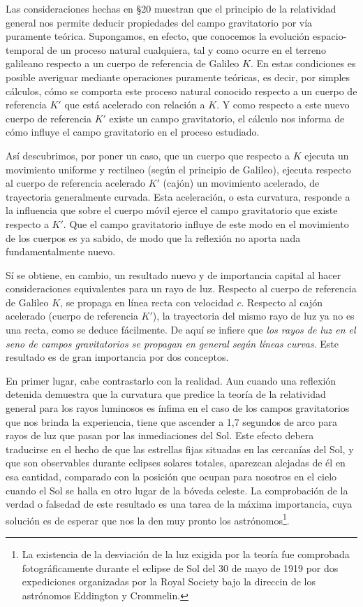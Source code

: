 \documentclass[spanish]{book}
\begin{document}
Las consideraciones hechas en \S 20 muestran que el principio de la relatividad
general nos permite deducir propiedades del campo gravitatorio por vía puramente
teórica. Supongamos, en efecto, que conocemos la evolución espacio-temporal de un
proceso natural cualquiera, tal y como ocurre en el terreno galileano respecto a un
cuerpo de referencia de Galileo $K$. En estas condiciones es posible averiguar mediante
operaciones puramente teóricas, es decir, por simples cálculos, cómo se comporta este
proceso natural conocido respecto a un cuerpo de referencia $K'$ que está acelerado con
relación a $K$. Y como respecto a este nuevo cuerpo de referencia $K'$ existe un campo
gravitatorio, el cálculo nos informa de cómo influye el campo gravitatorio en el
proceso estudiado.

Así descubrimos, por poner un caso, que un cuerpo que respecto a $K$ ejecuta un
movimiento uniforme y rectilneo (según el principio de Galileo), ejecuta respecto al
cuerpo de referencia acelerado $K'$ (cajón) un movimiento acelerado, de trayectoria
generalmente curvada. Esta aceleración, o esta curvatura, responde a la influencia que
sobre el cuerpo móvil ejerce el campo gravitatorio que existe respecto a $K'$. Que el
campo gravitatorio influye de este modo en el movimiento de los cuerpos es ya sabido,
de modo que la reflexión no aporta nada fundamentalmente nuevo.

Sí se obtiene, en cambio, un resultado nuevo y de importancia capital al hacer
consideraciones equivalentes para un rayo de luz. Respecto al cuerpo de referencia de
Galileo $K$, se propaga en línea recta con velocidad $c$. Respecto al cajón acelerado
(cuerpo de referencia $K'$), la trayectoria del mismo rayo de luz ya no es una recta, como
se deduce fácilmente. De aquí se infiere que \textit{los rayos de luz en el seno de campos
gravitatorios se propagan en general según líneas curvas}. Este resultado es de gran
importancia por dos conceptos.

En primer lugar, cabe contrastarlo con la realidad. Aun cuando una reflexión
detenida demuestra que la curvatura que predice la teoría de la relatividad general para
los rayos luminosos es ínfima en el caso de los campos gravitatorios que nos brinda
la experiencia, tiene que ascender a 1,7 segundos de arco para rayos de luz que pasan
por las inmediaciones del Sol. Este efecto debera traducirse en el hecho de que las
estrellas fijas situadas en las cercanías del Sol, y que son observables durante eclipses
solares totales, aparezcan alejadas de él en esa cantidad, comparado con la posición
que ocupan para nosotros en el cielo cuando el Sol se halla en otro lugar de la bóveda
celeste. La comprobación de la verdad o falsedad de este resultado es una tarea de la
máxima importancia, cuya solución es de esperar que nos la den muy pronto los
astrónomos\footnote{La existencia de la desviación de la luz exigida por la teoría fue comprobada fotográficamente durante el eclipse de Sol del 30 de mayo de 1919 por dos expediciones
organizadas por la Royal Society bajo la direccin de los astrónomos Eddington y Crommelin.}.
\end{document}
